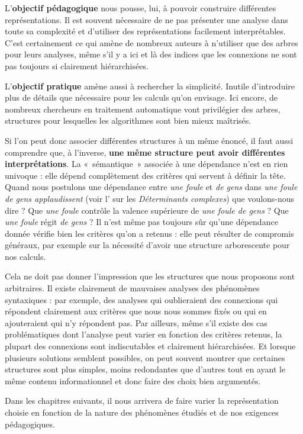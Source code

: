 L’\textbf{objectif pédagogique} nous pousse, lui, à pouvoir construire différentes représentations. Il est souvent nécessaire de ne pas présenter une analyse dans toute sa complexité et d’utiliser des représentations facilement interprétables. C’est certainement ce qui amène de nombreux auteurs à n’utiliser que des arbres pour leurs analyses, même s’il y a ici et là des indices que les connexions ne sont pas toujours si clairement hiérarchisées.

L’\textbf{objectif pratique} amène aussi à rechercher la simplicité. Inutile d’introduire plus de détails que nécessaire pour les calculs qu’on envisage. Ici encore, de nombreux chercheurs en traitement automatique vont privilégier des arbres, structures pour lesquelles les algorithmes sont bien mieux maîtrisés.

Si l’on peut donc associer différentes structures à un même énoncé, il faut aussi comprendre que, à l’inverse, \textbf{une même structure peut avoir différentes interprétations}. La «~sémantique~» associée à une dépendance n’est en rien univoque : elle dépend complètement des critères qui servent à définir la tête. Quand nous postulons une dépendance entre \textit{une foule} et \textit{de gens} dans \textit{une foule de gens applaudissent} (voir l’ sur les \textit{Déterminants complexes}) que voulons-nous dire ? Que \textit{une foule} contrôle la valence supérieure de \textit{une foule de gens} ? Que \textit{une foule} régit \textit{de gens} ? Il n’est même pas toujours sûr qu’une dépendance donnée vérifie bien les critères qu’on a retenus : elle peut résulter de compromis généraux, par exemple sur la nécessité d’avoir une structure arborescente pour nos calculs.

Cela ne doit pas donner l’impression que les structures que nous proposons sont arbitraires. Il existe clairement de mauvaises analyses des phénomènes syntaxiques : par exemple, des analyses qui oublieraient des connexions qui répondent clairement aux critères que nous nous sommes fixés ou qui en ajouteraient qui n’y répondent pas. Par ailleurs, même s’il existe des cas problématiques dont l’analyse peut varier en fonction des critères retenus, la plupart des connexions sont indiscutables et clairement hiérarchisées. Et lorsque plusieurs solutions semblent possibles, on peut souvent montrer que certaines structures sont plus simples, moins redondantes que d’autres tout en ayant le même contenu informationnel et donc faire des choix bien argumentés.

Dans les chapitres suivants, il nous arrivera de faire varier la représentation choisie en fonction de la nature des phénomènes étudiés et de nos exigences pédagogiques.

